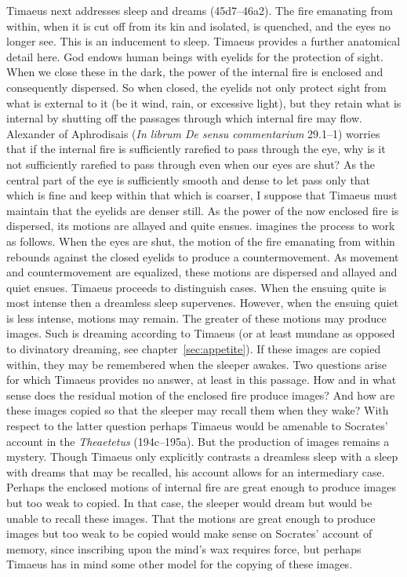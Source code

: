 Timaeus next addresses sleep and dreams (45d7--46a2). The fire emanating from within, when it is cut off from its kin and isolated, is quenched, and the eyes no longer see. This is an inducement to sleep. Timaeus provides a further anatomical detail here. God endows human beings with eyelids for the protection of sight. When we close these in the dark, the power of the internal fire is enclosed and consequently dispersed. So when closed, the eyelids not only protect sight from what is external to it (be it wind, rain, or excessive light), but they retain what is internal by shutting off the passages through which internal fire may flow. Alexander of Aphrodisais (\emph{In librum De sensu commentarium} 29.1--1) worries that if the internal fire is sufficiently rarefied to pass through the eye, why is it not sufficiently rarefied to pass through even when our eyes are shut? As the central part of the eye is sufficiently smooth and dense to let pass only that which is fine and keep within that which is coarser, I suppose that Timaeus must maintain that the eyelids are denser still. As the power of the now enclosed fire is dispersed, its motions are allayed and quite ensues. \citet[282--3]{Taylor:1928qb} imagines the process to work as follows. When the eyes are shut, the motion of the fire emanating from within rebounds against the closed eyelids to produce a countermovement. As movement and countermovement are equalized, these motions are dispersed and allayed and quiet ensues. Timaeus proceeds to distinguish cases. When the ensuing quite is most intense then a dreamless sleep supervenes. However, when the ensuing quiet is less intense, motions may remain. The greater of these motions may produce images. Such is dreaming according to Timaeus (or at least mundane as opposed to divinatory dreaming, see chapter~\ref{sec:appetite}). If these images are copied within, they may be remembered when the sleeper awakes. Two questions arise for which Timaeus provides no answer, at least in this passage. How and in what sense does the residual motion of the enclosed fire produce images? And how are these images copied so that the sleeper may recall them when they wake? With respect to the latter question perhaps Timaeus would be amenable to Socrates' account in the \emph{Theaetetus} (194c--195a). But the production of images remains a mystery. Though Timaeus only explicitly contrasts a dreamless sleep with a sleep with dreams that may be recalled, his account allows for an intermediary case. Perhaps the enclosed motions of internal fire are great enough to produce images but too weak to copied. In that case, the sleeper would dream but would be unable to recall these images. That the motions are great enough to produce images but too weak to be copied would make sense on Socrates' account of memory, since inscribing upon the mind's wax requires force, but perhaps Timaeus has in mind some other model for the copying of these images. 

